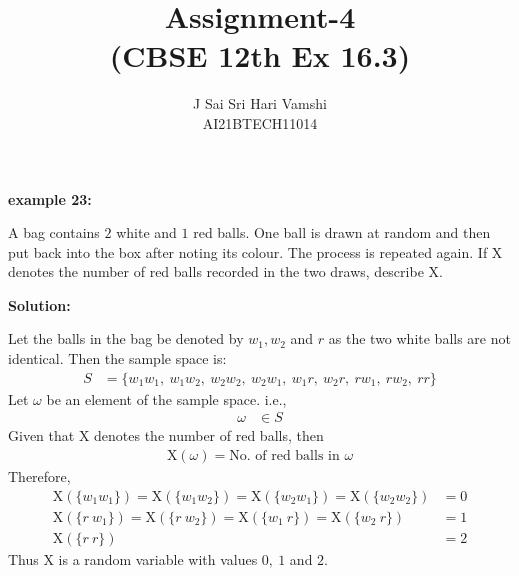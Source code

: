 \documentclass[journal,12pt,twocolumn]{article}\usepackage[margin=1.25 in]{geometry}
\title{\LARGE{\textbf{Assignment-4}\\(CBSE 12th Ex 16.3)}}
\author{\normalsize J Sai Sri Hari Vamshi\\ \footnotesize AI21BTECH11014}
\date{}
\providecommand{\x}[1]{\ensuremath{\text{X}\left(#1\right)}}
\begin{document}
\maketitle
\begin{center}
    \textbf{\large example 23:}
\end{center}

\noindent A bag contains $2$ white and $1$ red balls. One ball is drawn at random and then put back into the box after noting its colour. The process is repeated again. If X denotes the number of red balls recorded in the two draws, describe X.

\begin{center}
    \textbf{\large Solution:}
\end{center}

\noindent Let the balls in the bag be denoted by $w_1, w_2$ and $r$ as the two white balls are not identical.
\noindent Then the sample space is:
	\begin{align*}
	S & = \{w_1 w_1,\ w_1 w_2,\ w_2 w_2,\ w_2 w_1,\ w_1 r,\ w_2 r,\ r w_1,\ r 	w_2,\ r r\}
	\end{align*}
\noindent Let $\omega$ be an element of the sample space. i.e.,
	\begin{align*}
	\omega & \in S
	\end{align*}
\noindent Given that X denotes the number of red balls, then 
	\begin{align*}
	\x{\omega} = \text{No. of red balls in }\omega
	\end{align*}
\noindent Therefore,
	\begin{align*}
	\x{\{w_1 w_1\}} = \x{\{w_1 w_2\}} = \x{\{w_2 w_1\}} = \x{\{w_2 w_2\}} & = 0\\
	\x{\{r\ w_1\}} = \x{\{r\ w_2\}} = \x{\{w_1\ r\}} = \x{\{w_2\ r\}} & = 1\\
	\x{\{r\ r\}} & = 2
	\end{align*}
\noindent Thus X is a random variable with values $0,\ 1$ and $2$.
\end{document}
